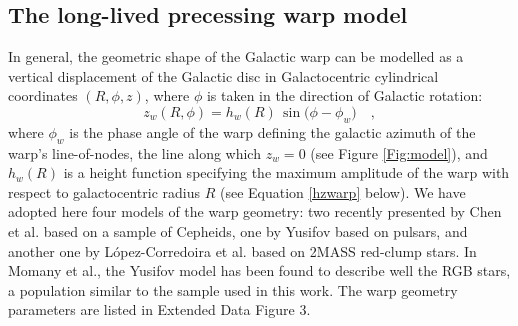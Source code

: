 \documentclass{nature}
\begin{document}
\begin{methods}


\renewcommand{\figurename}{ Extended Data Figure}


\subsection{The long-lived precessing warp model}

In general, the geometric shape of the Galactic warp can be modelled as a vertical displacement of the Galactic disc in Galactocentric cylindrical coordinates $(R,\phi,z)$, where $\phi$ is taken in the direction of Galactic rotation: 
\begin {equation}
\label{zwarp} 
z_w(R,\phi) = h_w(R) \, \sin{(\phi - \phi_{w}}) \quad,
\end{equation}
where $\phi_{w}$ is the phase angle of the warp defining the galactic azimuth of the warp's line-of-nodes, the line along which $z_w = 0$ (see Figure \ref{Fig:model}), and $h_w(R)$ is a height function specifying the maximum amplitude of the warp with respect to galactocentric radius $R$ (see Equation \ref{hzwarp} below). We have adopted here four models of the warp geometry: two recently presented by Chen et al.\cite{Chen:2019} based on a sample of Cepheids, one by Yusifov\cite{Yusifov:2004} based on pulsars, and another one by L\'{o}pez-Corredoira et al.\cite{LopezCorredoira:2002B} based on 2MASS red-clump stars. In Momany et al.\cite{Momany:2006}, the Yusifov model has been found to describe well the RGB stars, a population similar to the sample used in this work. The warp geometry parameters are listed in Extended Data Figure 3. 


\end{methods}
\end{document}
